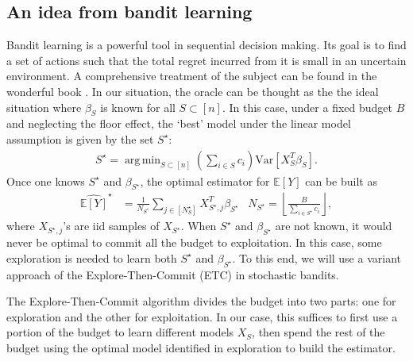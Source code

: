 \documentclass[11pt,a4paper]{amsart}
\numberwithin{equation}{section}
\theoremstyle{plain}
\theoremstyle{definition}
\def\E{{\mathbb E}}
\def\var{{\text{Var}}}
\DeclareMathOperator*{\argmin}{arg\,min}
\begin{document}
\subsection{An idea from bandit learning}

Bandit learning is a powerful tool in sequential decision making.
Its goal is to find a set of actions such that the total regret incurred from it is small in an uncertain environment. 
A comprehensive treatment of the subject can be found in the wonderful book \cite{lattimore2020bandit}.
In our situation, the oracle can be thought as the the ideal situation where $\beta_S$ is known for all $S\subset [n]$. 
In this case, under a fixed budget $B$ and neglecting the floor effect, the `best' model under the linear model assumption is given by the set $S^\star$:
\begin{align}
S^\star = \argmin_{S\subset [n]}\left(\sum_{i\in S}c_i\right)\var[X_S^T\beta_S].\label{3}
\end{align}
Once one knows $S^\star$ and $\beta_{S^\star}$, the optimal estimator for $\E[Y]$ can be built as
\begin{align}
\widehat{\E[Y]}^\star &= \frac{1}{N_{S^\star}}\sum_{j\in [N_S^\star]}X_{{S^\star},j}^T\beta_{S^\star}& N_{S^\star} = \left\lfloor \frac{B}{\sum_{i\in S^\star} c_i}\right\rfloor,\label{4}
\end{align} 
where $X_{{S^\star},j}$'s are iid samples of $X_{S^\star}$. 
When $S^\star$ and $\beta_{S^\star}$ are not known, it would never be optimal to commit all the budget to exploitation. 
In this case, some exploration is needed to learn both $S^\star$ and $\beta_{S^\star}$. 
To this end, we will use a variant approach of the Explore-Then-Commit (ETC) in stochastic bandits.


The Explore-Then-Commit algorithm \cite[Chapter 6]{lattimore2020bandit} divides the budget into two parts: one for exploration and the other for exploitation. 
In our case, this suffices to first use a portion of the budget to learn different models $X_S$, then spend the rest of the budget using the optimal model identified in exploration to build the estimator. 
\end{document}
